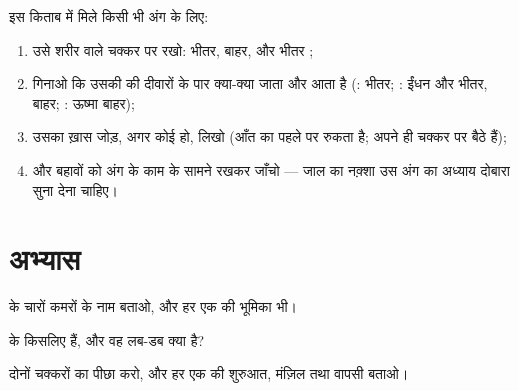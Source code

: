 \begin{method}[किसी भी अंग को जाल में उतारना]\label{met:g7:heart-and-circulation:map}
इस किताब में मिले किसी भी अंग के लिए:
\begin{enumerate}
  \item उसे शरीर वाले चक्कर पर रखो:  भीतर, 
        बाहर, और भीतर ;
  \item गिनाओ कि उसकी  की दीवारों के पार क्या-क्या जाता और
        आता है (:  भीतर; : ईंधन और
         भीतर,  बाहर; : ऊष्मा बाहर);
  \item उसका ख़ास जोड़, अगर कोई हो, लिखो (आँत का  पहले  पर
        रुकता है;  अपने ही चक्कर पर बैठे हैं);
  \item और बहावों को अंग के काम के सामने रखकर जाँचो --- जाल का
        नक़्शा उस अंग का अध्याय दोबारा सुना देना चाहिए।
\end{enumerate}
\end{method}

\section{अभ्यास}

\begin{exercise}[$\star$]\label{exo:g7:heart-and-circulation:1}
 के चारों कमरों के नाम बताओ, और हर एक की भूमिका भी।
\end{exercise}

\begin{exercise}[$\star$]\label{exo:g7:heart-and-circulation:2}
 के  किसलिए हैं, और वह लब-डब क्या है?
\end{exercise}

\begin{exercise}[$\star$]\label{exo:g7:heart-and-circulation:3}
दोनों चक्करों का पीछा करो, और हर एक की शुरुआत, मंज़िल तथा वापसी बताओ।
\end{exercise}

